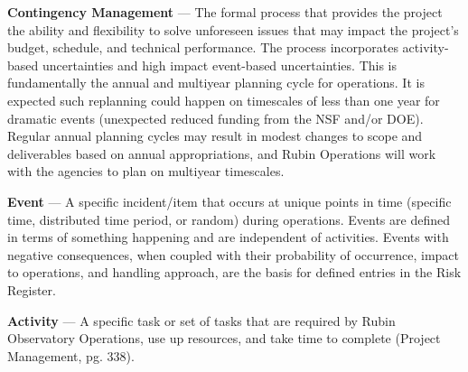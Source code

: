 \textbf{Contingency Management} ---
The formal process that provides the project the ability and flexibility to solve unforeseen issues that may impact the project’s budget, schedule, and technical performance.
The process incorporates activity-based uncertainties and high impact event-based uncertainties.
This is fundamentally the annual and multiyear planning cycle for operations.
It is expected such replanning could happen on timescales of less than one year for dramatic events (unexpected reduced funding from the NSF and/or DOE).
Regular annual planning cycles may result in modest changes to scope and deliverables based on annual appropriations, and Rubin Operations will work with the agencies to plan on multiyear timescales.

\textbf{Event} ---
A specific incident/item that occurs at unique points in time (specific time, distributed time period, or random) during operations.
Events are defined in terms of something happening and are independent of activities.
Events with negative consequences, when coupled with their probability of occurrence, impact to operations, and handling approach, are the basis for defined entries in the Risk Register.

\textbf{Activity} ---
A specific task or set of tasks that are required by Rubin Observatory Operations, use up resources, and take time to complete (Project Management, pg. 338).


